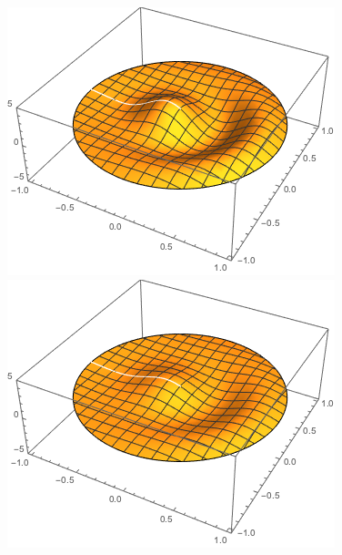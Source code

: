 \documentclass{paper}
\begin{document}
\begin{figure}[!htb]
      \includegraphics[width=\linewidth]{images/heat1.png}
    \endminipage\hfill
      \includegraphics[width=\linewidth]{images/heat2.png}
    \endminipage\hfill

\end{figure}
\end{document}
